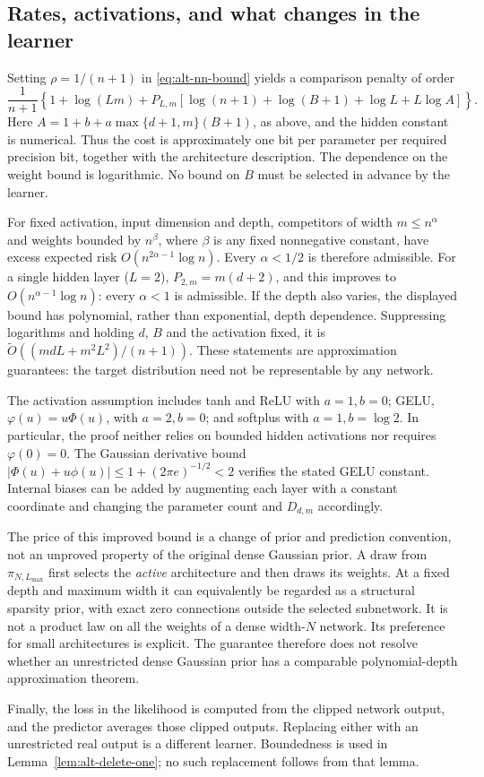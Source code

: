 \subsection{Rates, activations, and what changes in the learner}

Setting $\rho=1/(n+1)$ in \eqref{eq:alt-nn-bound} yields a comparison
penalty of order
\begin{equation}
 \frac{1}{n+1}\left\{
 1+\log(Lm)
 +P_{L,m}\left[
   \log(n+1)+\log(B+1)+\log L
      +L\log A
                  \right]\right\}.
 \label{eq:alt-rate-summary}
\end{equation}
Here $A=1+b+a\max\{d+1,m\}(B+1)$, as above, and the hidden
constant is numerical.  Thus the cost is approximately one
bit per parameter per required precision bit, together with the
architecture description.  The dependence on the weight bound is
logarithmic.  No bound on $B$ must be selected in advance by the learner.

For fixed activation, input dimension and depth, competitors of width
$m\le n^\alpha$ and weights bounded by $n^\beta$, where $\beta$ is any
fixed nonnegative constant, have excess expected risk
$O(n^{2\alpha-1}\log n)$.  Every $\alpha<1/2$ is therefore admissible.
For a single hidden layer ($L=2$),
$P_{2,m}=m(d+2)$, and this improves to
$O(n^{\alpha-1}\log n)$: every $\alpha<1$ is admissible.
If the depth also varies, the displayed bound has polynomial, rather
than exponential, depth dependence.  Suppressing logarithms and holding
$d$, $B$ and the activation fixed, it is
$\widetilde O((mdL+m^2L^2)/(n+1))$.
These statements are approximation guarantees: the target distribution
need not be representable by any network.

The activation assumption includes tanh and ReLU with $a=1,b=0$;
GELU, $\varphi(u)=u\Phi(u)$, with $a=2,b=0$; and softplus with
$a=1,b=\log2$.  In particular, the proof neither relies on bounded
hidden activations nor requires $\varphi(0)=0$.  The Gaussian derivative
bound $|\Phi(u)+u\phi(u)|\le1+(2\pi e)^{-1/2}<2$ verifies the stated
GELU constant.  Internal biases can be added by augmenting each layer
with a constant coordinate and changing the parameter count and
$D_{d,m}$ accordingly.

The price of this improved bound is a change of prior and prediction
convention, not an unproved property of the original dense Gaussian
prior.  A draw from $\pi_{N,L_{\max}}$ first selects the \emph{active}
architecture and then draws its weights.  At a fixed depth and maximum width it
can equivalently be regarded as a structural sparsity prior, with exact
zero connections outside the selected subnetwork.  It is not a product
law on all the weights of a dense width-$N$ network.  Its preference for
small architectures is explicit.  The guarantee therefore does not
resolve whether an unrestricted dense Gaussian prior has a comparable
polynomial-depth approximation theorem.

Finally, the loss in the likelihood is computed from the clipped
network output, and the predictor averages those clipped outputs.
Replacing either with an unrestricted real output is a different
learner.  Boundedness is used in Lemma~\ref{lem:alt-delete-one}; no such
replacement follows from that lemma.
